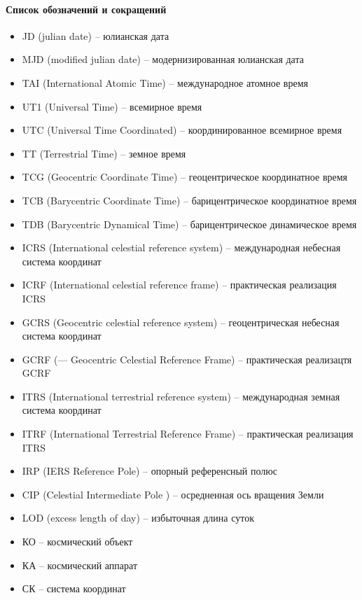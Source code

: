 \paragraph{Список обозначений и сокращений}

\begin{itemize}
    \item JD (julian date) -- юлианская дата
    \item MJD (modified julian date) -- модернизированная юлианская дата
    \item TAI (International Atomic Time) -- международное атомное время
    \item UT1 (Universal Time) -- всемирное время
    \item UTC (Universal Time Coordinated) -- координированное всемирное время
    \item TT (Terrestrial Time) -- земное время
    \item TCG (Geocentric Coordinate Time) -- геоцентрическое координатное время
    \item TCB (Barycentric Coordinate Time) -- барицентрическое координатное время
    \item TDB (Barycentric Dynamical Time) -- барицентрическое динамическое время
    \item ICRS (International celestial reference system) -- международная небесная
    система координат
    \item ICRF (International celestial reference
    frame) -- практическая реализация ICRS
    \item GCRS (Geocentric celestial reference system) -- геоцентрическая небесная
    система координат
    \item GCRF (— Geocentric Celestial Reference
    Frame) -- практическая реализацтя GCRF
    \item ITRS (International terrestrial reference system) -- международная земная система координат
    \item ITRF (International Terrestrial Reference
    Frame) -- практическая реализация ITRS
    \item IRP (IERS Reference Pole) -- опорный референсный полюс
    \item CIP (Celestial Intermediate Pole ) -- осредненная ось вращения Земли
    \item LOD (excess length of day) -- избыточная длина суток
    \item КО -- космический объект
    \item КА -- космический аппарат
    \item СК -- система координат

\end{itemize}
